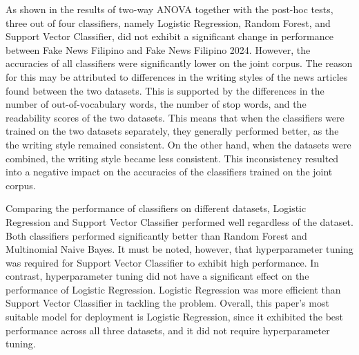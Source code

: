 As shown in the results of two-way ANOVA together with the post-hoc tests, three out of four classifiers, namely Logistic Regression, Random Forest, and Support Vector Classifier, did not exhibit a significant change in performance between Fake News Filipino and Fake News Filipino 2024. However, the accuracies of all classifiers were significantly lower on the joint corpus. The reason for this may be attributed to differences in the writing styles of the news articles found between the two datasets. This is supported by the differences in the number of out-of-vocabulary words, the number of stop words, and the readability scores of the two datasets. This means that when the classifiers were trained on the two datasets separately, they generally performed better, as the the writing style remained consistent. On the other hand, when the datasets were combined, the writing style became less consistent. This inconsistency resulted into a negative impact on the accuracies of the classifiers trained on the joint corpus.

Comparing the performance of classifiers on different datasets, Logistic Regression and Support Vector Classifier performed well regardless of the dataset. Both classifiers performed significantly better than Random Forest and Multinomial Naive Bayes. It must be noted, however, that hyperparameter tuning was required for Support Vector Classifier to exhibit high performance. In contrast, hyperparameter tuning did not have a significant effect on the performance of Logistic Regression. Logistic Regression was more efficient than Support Vector Classifier in tackling the problem. Overall, this paper's most suitable model for deployment is Logistic Regression, since it exhibited the best performance across all three datasets, and it did not require hyperparameter tuning.

\pagebreak
